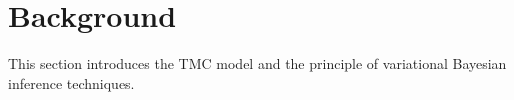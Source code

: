 \documentclass{article}
\def\x{{\mathbf x}}
\def\z{{\mathbf z}}
\def\y{{\mathbf y}}
\def\yl{{\mathbf y}_{T}^{\mathcal{L}}}
\def\yu{{\mathbf y}_{T}^{\mathcal{U}}}
\def\L{{\mathcal L}}
\def\p{p_{\theta}}
\def\L{\mathcal{L}}
\def\U{\mathcal{U}}
\begin{document}












\section{Background}
\label{sec:background}
This section introduces the TMC model and the principle of
variational Bayesian inference techniques.
\end{document}
